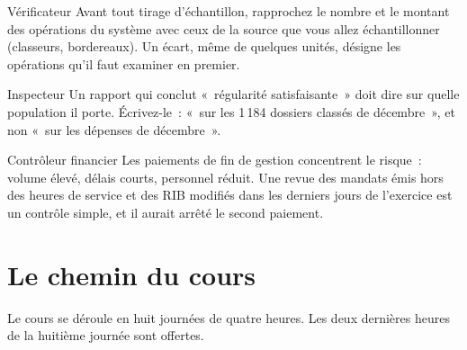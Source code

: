 \begin{boxmetier}{Vérificateur}
Avant tout tirage d'échantillon, rapprochez le nombre et le montant des
opérations du système avec ceux de la source que vous allez échantillonner
(classeurs, bordereaux). Un écart, même de quelques unités, désigne les
opérations qu'il faut examiner en premier.
\end{boxmetier}

\begin{boxmetier}{Inspecteur}
Un rapport qui conclut «~régularité satisfaisante~» doit dire sur quelle
population il porte. Écrivez-le~: «~sur les 1\,184 dossiers classés de
décembre~», et non «~sur les dépenses de décembre~».
\end{boxmetier}

\begin{boxmetier}{Contrôleur financier}
Les paiements de fin de gestion concentrent le risque~: volume élevé,
délais courts, personnel réduit. Une revue des mandats émis hors des
heures de service et des RIB modifiés dans les derniers jours de
l'exercice est un contrôle simple, et il aurait arrêté le second paiement.
\end{boxmetier}

\separateur

\section{Le chemin du cours}
\label{sec:pro-chemin}

Le cours se déroule en huit journées de quatre heures. Les deux dernières
heures de la huitième journée sont offertes.

